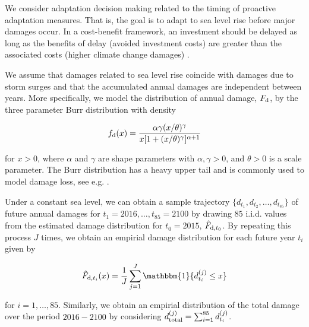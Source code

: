 \documentclass[draft,linenumbers]{agujournal}
\begin{document}
We consider adaptation decision making related to the timing of proactive adaptation measures. That is, the goal is to adapt to sea level rise before major damages occur. In a cost-benefit framework, an investment should be delayed as long as the benefits of delay (avoided investment costs) are greater than the associated costs (higher climate change damages) \citep{Fankhauser&1999}.

We assume that damages related to sea level rise coincide with damages due to storm surges and that the accumulated annual damages are independent between years. More specifically, we model the distribution of annual damage, $F_{\textup{d}}$, by the three parameter Burr distribution \citep{Burr1942} with density
\begin{linenomath*}
  \begin{equation}\label{eq:Burr}
  f_{\textup{d}} (x) = \frac{\alpha \gamma (x/ \theta)^{\gamma}}{x [ 1 + (x/ \theta)^{\gamma}]^{\alpha + 1}}
  \end{equation}
\end{linenomath*}
for $x > 0$, where $\alpha$ and $\gamma$ are shape parameters with $\alpha, \gamma > 0$, and $\theta >0$ is a scale parameter. The Burr distribution has a heavy upper tail and is commonly used to model damage loss, see e.g. \cite{Klugman&2012}.

Under a constant sea level, we can obtain a sample trajectory $\{d_{t_1}, d_{t_2}, \ldots, d_{t_{85}}\}$ of future annual damages for $t_1 = 2016, \ldots, t_{85} = 2100$ by drawing $85$ i.i.d. values from the estimated damage distribution for $t_0 = 2015$, $\hat{F}_{\textup{d}, t_0}$.  By repeating this process $J$ times, we obtain an empirial damage distribution for each future year $t_i$ given by
\begin{linenomath*}
  \[
  \hat{F}_{\textup{d}, t_i} (x) = \frac{1}{J} \sum_{j=1}^J \mathbbm{1}\{d_{t_i}^{(j)} \leq x \}
  \]
\end{linenomath*}
for $i = 1, \ldots, 85$. Similarly, we obtain an empirial distribution of the total damage over the period $2016-2100$ by considering $d_{\textup{total}}^{(j)} = \sum_{i=1}^{85} d_{t_i}^{(j)}$.  
\end{document}
